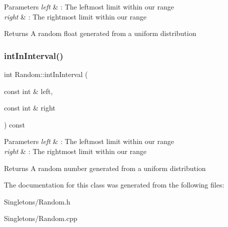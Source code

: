 \begin{DoxyParams}{Parameters}
{\em left} & \+: The leftmost limit within our range \\
\hline
{\em right} & \+: The rightmost limit within our range \\
\hline
\end{DoxyParams}
\begin{DoxyReturn}{Returns}
A random float generated from a uniform distribution 
\end{DoxyReturn}
\mbox{\label{class_random_a35a3289bf89b45e55c3cb69bf36453c2}} 
\subsubsection{\texorpdfstring{int\+In\+Interval()}{intInInterval()}}
{\footnotesize\ttfamily int Random\+::int\+In\+Interval (\begin{DoxyParamCaption}\item[{const int \&}]{left,  }\item[{const int \&}]{right }\end{DoxyParamCaption}) const\hspace{0.3cm}{\ttfamily [inline]}}


\begin{DoxyParams}{Parameters}
{\em left} & \+: The leftmost limit within our range \\
\hline
{\em right} & \+: The rightmost limit within our range \\
\hline
\end{DoxyParams}
\begin{DoxyReturn}{Returns}
A random number generated from a uniform distribution 
\end{DoxyReturn}


The documentation for this class was generated from the following files\+:\begin{DoxyCompactItemize}
\item 
Singletons/Random.\+h\item 
Singletons/Random.\+cpp\end{DoxyCompactItemize}
